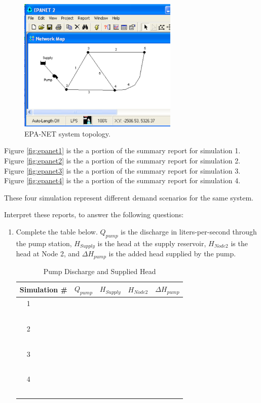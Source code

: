 \documentclass[11pt]{article}
\begin{document}
\begin{enumerate}
\begin{figure}[h!] %
\centering
   \includegraphics[width=3in]{epa-net-map.pdf}
   \caption{EPA-NET system topology.}
   \label{fig:epa-net-map} 
\end{figure}

Figure \ref{fig:epanet1} is the a portion of the summary report for simulation 1.   
Figure \ref{fig:epanet2} is the a portion of the summary report for simulation 2.  
Figure \ref{fig:epanet3} is the a portion of the summary report for simulation 3.  
Figure \ref{fig:epanet4} is the a portion of the summary report for simulation 4.

These four simulation represent different demand scenarios for the same system.



Interpret these reports, to answer the following questions:

\begin{enumerate}
\item Complete the table below.  $Q_{pump}$ is the discharge in liters-per-second through the pump station, $H_{Supply}$ is the head at the supply reservoir,  $H_{Node2}$ is the head at Node 2, and $\Delta H_{pump}$ is the added head supplied by the pump.
\begin{table}[htbp]
   \centering
      \caption{Pump Discharge and Supplied Head}
   \begin{tabular}{p{1in} p{1in} p{1in} p{1in} p{1in} } %
Simulation \# & $Q_{pump}$ & $H_{Supply}$ & $H_{Node2}$ & $\Delta H_{pump}$ \\
\hline
\hline
~~1 & ~ &~ & ~ & ~ \\
~ & ~ &~ & ~ & ~ \\
\hline
~~2 & ~ &~ & ~ & ~ \\
~ & ~ &~ & ~ & ~ \\
\hline
~~3 & ~ &~ & ~ & ~\\
~ & ~ &~ & ~ & ~ \\
\hline
~~4 & ~ &~ & ~ & ~ \\
~ & ~ &~ & ~ & ~ \\
\hline
   \end{tabular}
   \label{tab:pump-curve}
\end{table}


\end{enumerate}
\end{enumerate}
\end{document}
